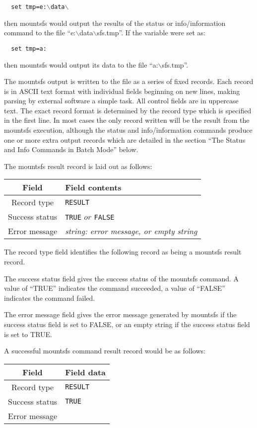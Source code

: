     {\tt \verb|  |set tmp=e:$\backslash$data$\backslash$}

then mountsfs would output the results of the status or info/information
command to the file ``e:$\backslash$data$\backslash$sfs.tmp''.  If the variable were set as:

    {\tt \verb|  |set tmp=a:}

then mountsfs would output its data to the file ``a:$\backslash$sfs.tmp''.

The mountsfs output is written to the file as a series of fixed records.  Each
record is in ASCII text format with individual fields beginning on new lines,
making parsing by external software a simple task.  All control fields are in
uppercase text.  The exact record format is determined by the record type which
is specified in the first line.  In most cases the only record written will be
the result from the mountsfs execution, although the status and
info/information commands produce one or more extra output records which are
detailed in the section ``The Status and Info Commands in Batch Mode'' below.

The mountsfs result record is laid out as follows:

\begin{center}
\begin{tabular}{|c|l|}
\hline
    Field            &   Field contents\\
\hline
    Record type      &   {\tt RESULT}\\
    Success status   &   {\tt TRUE} $or$ {\tt FALSE}\\
    Error message    &   {\em string: error message, or empty string}\\
\hline
\end{tabular}
\end{center}

The record type field identifies the following record as being a mountsfs
result record.

The success status field gives the success status of the mountsfs command.  A
value of ``TRUE'' indicates the command succeeded, a value of ``FALSE'' indicates
the command failed.

The error message field gives the error message generated by mountsfs if the
success status field is set to FALSE, or an empty string if the success status
field is set to TRUE.

A successful mountsfs command result record would be as follows:

\begin{center}
\begin{tabular}{|c|l|}
\hline
    Field              &     Field data\\
\hline
    Record type        &     {\tt RESULT}\\
    Success status     &     {\tt TRUE}\\
    Error message      & \\
\hline
\end{tabular}
\end{center}

